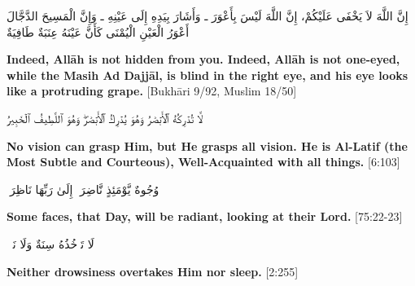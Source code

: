 \begin{center}
    \begin{RLtext}
        إِنَّ اللَّهَ لاَ يَخْفَى عَلَيْكُمْ، إِنَّ اللَّهَ لَيْسَ بِأَعْوَرَ ـ وَأَشَارَ بِيَدِهِ إِلَى عَيْنِهِ ـ وَإِنَّ الْمَسِيحَ الدَّجَّالَ أَعْوَرُ الْعَيْنِ الْيُمْنَى كَأَنَّ عَيْنَهُ عِنَبَةٌ طَافِيَةٌ
    \end{RLtext}
\end{center}
\textbf{Indeed, All\=ah is not hidden from you. Indeed, All\=ah is not one-eyed, while the Masih Ad Dajj\=al, is blind in the right eye, and his eye looks like a protruding grape.} [Bukh\=ari 9/92, Muslim 18/50]

\begin{center}
    \begin{RLtext}
        لَّا تُدۡرِكُهُ ٱلۡأَبۡصَٰرُ وَهُوَ يُدۡرِكُ ٱلۡأَبۡصَٰرَۖ وَهُوَ ٱللَّطِيفُ ٱلۡخَبِيرُ
    \end{RLtext}
\end{center}
\textbf{No vision can grasp Him, but He grasps all vision. He is Al-Latif (the Most Subtle and Courteous), Well-Acquainted with all things.} [6:103]
\begin{center}
    \begin{RLtext}
        وُجُوهٌ يَّوْمَئِذٍ نَّاضِرَةٌۙ إِلَىٰ رَبِّهَا نَاظِرَةٌۙ 
    \end{RLtext}
    \textbf{Some faces, that Day, will be radiant, looking at their Lord.} [75:22-23]
\end{center}
\begin{center}
    \begin{RLtext}
        لَا تَأۡخُذُهُ سِنَةٌ وَلَا نَوۡمٌۚ 
    \end{RLtext}
    \textbf{Neither drowsiness overtakes Him nor sleep.} [2:255]
\end{center}

